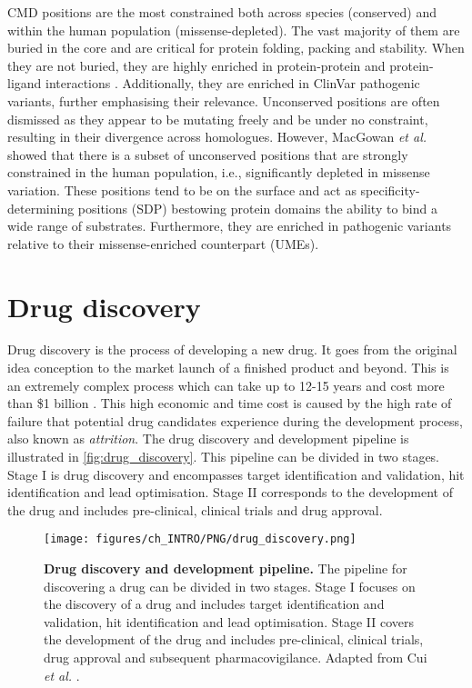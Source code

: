 CMD positions are the most constrained both across species (conserved) and within the human population (missense-depleted). The vast majority of them are buried in the core and are critical for protein folding, packing and stability. When they are not buried, they are highly enriched in protein-protein and protein-ligand interactions \cite{UTGES_2021_ANKS}. Additionally, they are enriched in ClinVar \cite{LANDRUM_2013_CLINVAR} pathogenic variants, further emphasising their relevance. Unconserved positions are often dismissed as they appear to be mutating freely and be under no constraint, resulting in their divergence across homologues. However, MacGowan \textit{et al.} \cite{MACGOWAN_2024_VARIANTS} showed that there is a subset of unconserved positions that are strongly constrained in the human population, i.e., significantly depleted in missense variation. These positions tend to be on the surface and act as specificity-determining positions (SDP) bestowing protein domains the ability to bind a wide range of substrates. Furthermore, they are enriched in pathogenic variants relative to their missense-enriched counterpart (UMEs).


\section{Drug discovery}

Drug discovery is the process of developing a new drug. It goes from the original idea conception to the market launch of a finished product and beyond. This is an extremely complex process which can take up to 12-15 years and cost more than \$1 billion \cite{HUGHES_2011_DRUGS}. This high economic and time cost is caused by the high rate of failure that potential drug candidates experience during the development process, also known as \textit{attrition}. The drug discovery and development pipeline is illustrated in \autoref{fig:drug_discovery}. This pipeline can be divided in two stages. Stage I is drug discovery and encompasses target identification and validation, hit identification and lead optimisation. Stage II corresponds to the development of the drug and includes pre-clinical, clinical trials and drug approval.

\begin{figure}[htb!]
    \centering
    \texttt{[image: figures/ch\_INTRO/PNG/drug\_discovery.png]}
    \caption[Drug discovery and development pipeline]{\textbf{Drug discovery and development pipeline.}  The pipeline for discovering a drug can be divided in two stages. Stage I focuses on the discovery of a drug and includes target identification and validation, hit identification and lead optimisation. Stage II covers the development of the drug and includes pre-clinical, clinical trials, drug approval and subsequent pharmacovigilance. Adapted from Cui \textit{et al.} \cite{CUI_2020_DRUGS}.}
    \label{fig:drug_discovery}
\end{figure}

